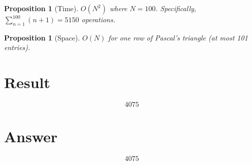 \documentclass[12pt]{article}
\newtheorem{proposition}[theorem]{Proposition}
\theoremstyle{definition}
\begin{document}
\begin{proposition}[Time]
$O(N^2)$ where $N = 100$. Specifically, $\sum_{n=1}^{100}(n+1) = 5150$ operations.
\end{proposition}

\begin{proposition}[Space]
$O(N)$ for one row of Pascal's triangle (at most 101 entries).
\end{proposition}

\section{Result}
\[
\boxed{4075}
\]

\section{Answer}

\[
\boxed{4075}
\]
\end{document}
